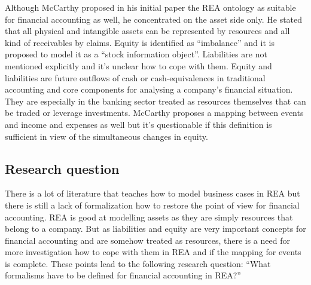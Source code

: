 Although McCarthy proposed in his initial paper \cite{mccarthy1982rea} the REA ontology as suitable for financial accounting as well, he concentrated on the asset side only.
He stated that all physical and intangible assets can be represented by resources and all kind of receivables by claims.
Equity is identified as ``imbalance'' and it is proposed to model it as a ``stock information object''.
Liabilities are not mentioned explicitly and it's unclear how to cope with them.
Equity and liabilities are future outflows of cash or cash-equivalences in traditional accounting and core components for analysing a company's financial situation.
They are especially in the banking sector treated as resources themselves that can be traded or leverage investments.
McCarthy proposes a mapping between events and income and expenses as well but it's questionable if this definition is sufficient in view of the simultaneous changes in equity.

\subsection*{Research question}

There is a lot of literature that teaches how to model business cases in REA but there is still a lack of formalization how to restore the point of view for financial accounting.
REA is good at modelling assets as they are simply resources that belong to a company.
But as liabilities and equity are very important concepts for financial accounting and are somehow treated as resources, there is a need for more investigation how to cope with them in REA and if the mapping for events is complete.
These points lead to the following research question: ``What formalisms have to be defined for financial accounting in REA?''


